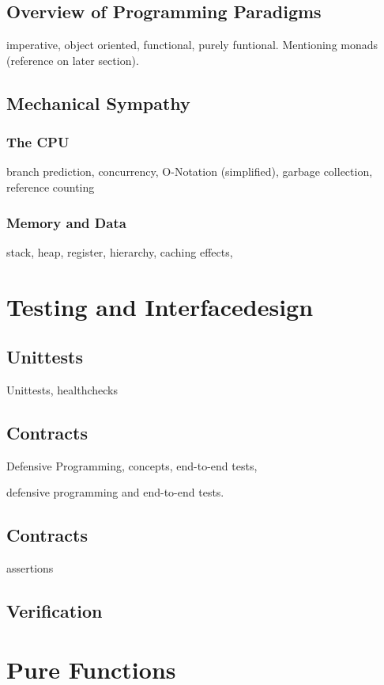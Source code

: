 \documentclass{book}
\begin{document}
\section{Overview of Programming Paradigms}
imperative, object oriented, functional, purely funtional. Mentioning monads (reference on later section). 

\section {Mechanical Sympathy}


\subsection{The CPU}
branch prediction, concurrency, O-Notation (simplified), garbage collection, reference counting

\subsection{Memory and Data}
stack, heap, register, hierarchy, caching effects, 


\chapter{Testing and Interfacedesign}

\section{Unittests}
Unittests, healthchecks

\section{Contracts}
Defensive Programming, concepts, end-to-end tests, 

defensive programming and end-to-end tests.

\section{Contracts}
assertions

\section{Verification}

\chapter{Pure Functions}
\end{document}
